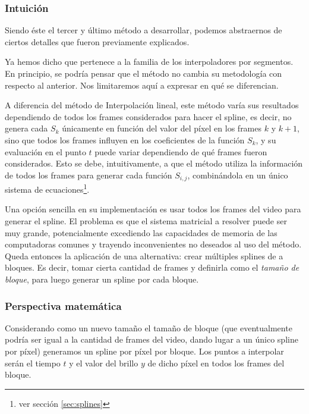 \subsubsection*{\bf{Intuición}}

Siendo \'este el tercer y \'ultimo m\'etodo a desarrollar, podemos abstraernos de ciertos detalles que fueron previamente explicados.

Ya hemos dicho que pertenece a la familia de los interpoladores por segmentos. En principio, se podr\'ia pensar que el método no cambia su metodolog\'ia con respecto al anterior. Nos limitaremos aquí a expresar en qué se diferencian.

A diferencia del m\'etodo de Interpolaci\'on lineal, este método varía sus resultados dependiendo de todos los frames considerados para hacer el spline, es decir, no genera cada $S_k$ únicamente en función del valor del píxel en los frames $k$ y $k+1$, sino que todos los frames influyen en los coeficientes de la funci\'on $S_k$, y su evaluación en el punto $t$ puede variar dependiendo de qué frames fueron considerados. Esto se debe, intuitivamente, a que el método utiliza la información de todos los frames para generar cada función $S_{i,j}$, combinándola en un único sistema de ecuaciones\footnote{ver sección \ref{sec:splines}}.

Una opción sencilla en su implementación es usar todos los frames del video para generar el spline. El problema es que el sistema matricial a resolver puede ser muy grande, potencialmente excediendo las capacidades de memoria de las computadoras comunes y trayendo inconvenientes no deseados al uso del método. Queda entonces la aplicación de una alternativa: crear múltiples splines de a bloques. Es decir, tomar cierta cantidad de frames y definirla como el \textit{tamaño de bloque}, para luego generar un spline por cada bloque.

\subsubsection*{\bf{Perspectiva matem\'atica}}
Considerando como un nuevo tamaño el tamaño de bloque (que eventualmente podría ser igual a la cantidad de frames del video, dando lugar a un único spline por píxel) generamos un spline por píxel por bloque. Los puntos a interpolar serán el tiempo $t$ y el valor del brillo $y$ de dicho píxel en todos los frames del bloque.

